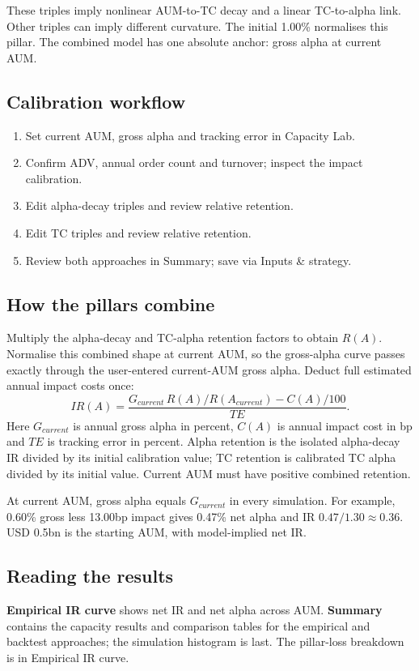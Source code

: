 \documentclass[11pt,a4paper]{article}
\begin{document}
These triples imply nonlinear AUM-to-TC decay and a linear TC-to-alpha link. Other triples can imply different curvature. The initial 1.00\% normalises this pillar. The combined model has one absolute anchor: gross alpha at current AUM.

\newpage
\subsection{Calibration workflow}
\begin{enumerate}
\item Set current AUM, gross alpha and tracking error in Capacity Lab.
\item Confirm ADV, annual order count and turnover; inspect the impact calibration.
\item Edit alpha-decay triples and review relative retention.
\item Edit TC triples and review relative retention.
\item Review both approaches in Summary; save via Inputs \& strategy.
\end{enumerate}

\subsection{How the pillars combine}
Multiply the alpha-decay and TC-alpha retention factors to obtain $R(A)$. Normalise this combined shape at current AUM, so the gross-alpha curve passes exactly through the user-entered current-AUM gross alpha. Deduct full estimated annual impact costs once:
\[
\boxed{IR(A)=\frac{G_{current}\,R(A)/R(A_{current})-C(A)/100}{TE}.}
\]
Here $G_{current}$ is annual gross alpha in percent, $C(A)$ is annual impact cost in bp and $TE$ is tracking error in percent. Alpha retention is the isolated alpha-decay IR divided by its initial calibration value; TC retention is calibrated TC alpha divided by its initial value. Current AUM must have positive combined retention.

At current AUM, gross alpha equals $G_{current}$ in every simulation. For example, 0.60\% gross less 13.00bp impact gives 0.47\% net alpha and IR $0.47/1.30\approx0.36$. USD 0.5bn is the starting AUM, with model-implied net IR.

\subsection{Reading the results}
\textbf{Empirical IR curve} shows net IR and net alpha across AUM. \textbf{Summary} contains the capacity results and comparison tables for the empirical and backtest approaches; the simulation histogram is last. The pillar-loss breakdown is in Empirical IR curve.
\end{document}
